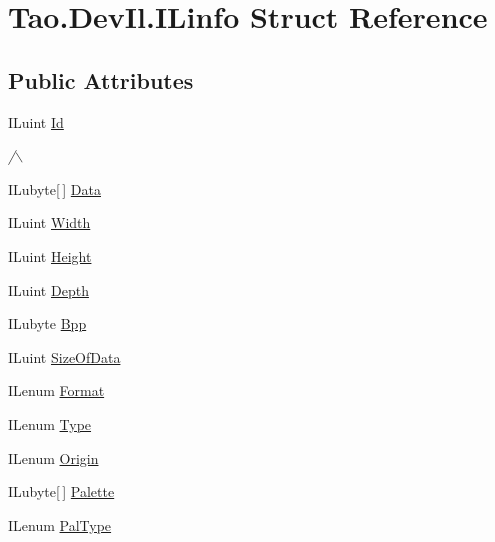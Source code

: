 \hypertarget{struct_tao_1_1_dev_il_1_1_i_linfo}{
\section{Tao.DevIl.ILinfo Struct Reference}
\label{struct_tao_1_1_dev_il_1_1_i_linfo}
}
\subsection*{Public Attributes}
\begin{DoxyCompactItemize}
\item 
ILuint \hyperlink{struct_tao_1_1_dev_il_1_1_i_linfo_abcb3b236f6529a7ff1ad87c5c74af767}{Id}
\begin{DoxyCompactList}\small\item\em /$\backslash$ \item\end{DoxyCompactList}\item 
ILubyte\mbox{[}$\,$\mbox{]} \hyperlink{struct_tao_1_1_dev_il_1_1_i_linfo_a2836ff5ae62f2622dc73ec30b4739473}{Data}
\item 
ILuint \hyperlink{struct_tao_1_1_dev_il_1_1_i_linfo_a909447aa8535479307a83fa1a3675474}{Width}
\item 
ILuint \hyperlink{struct_tao_1_1_dev_il_1_1_i_linfo_a30575c12e85ecc16042ed400fb06e6d0}{Height}
\item 
ILuint \hyperlink{struct_tao_1_1_dev_il_1_1_i_linfo_ad725c551e618eeee47e263aba25bbadd}{Depth}
\item 
ILubyte \hyperlink{struct_tao_1_1_dev_il_1_1_i_linfo_ab39a9f686ef8b7a5b1b5113c421fcc03}{Bpp}
\item 
ILuint \hyperlink{struct_tao_1_1_dev_il_1_1_i_linfo_a8f7425037e9554c9067f0229df9015f8}{SizeOfData}
\item 
ILenum \hyperlink{struct_tao_1_1_dev_il_1_1_i_linfo_a2a734d44a4ae705c1600983360792a0c}{Format}
\item 
ILenum \hyperlink{struct_tao_1_1_dev_il_1_1_i_linfo_a4d2d09a8089c9138992f5ec5ab53ab07}{Type}
\item 
ILenum \hyperlink{struct_tao_1_1_dev_il_1_1_i_linfo_a00726518e4015765485397ddf4c0e222}{Origin}
\item 
ILubyte\mbox{[}$\,$\mbox{]} \hyperlink{struct_tao_1_1_dev_il_1_1_i_linfo_a89f5f670454db3c87ed30940f5c8b593}{Palette}
\item 
ILenum \hyperlink{struct_tao_1_1_dev_il_1_1_i_linfo_a648098fe16bceb6aa69546fd9a9f16d0}{PalType}
\item 

\end{DoxyCompactItemize}
